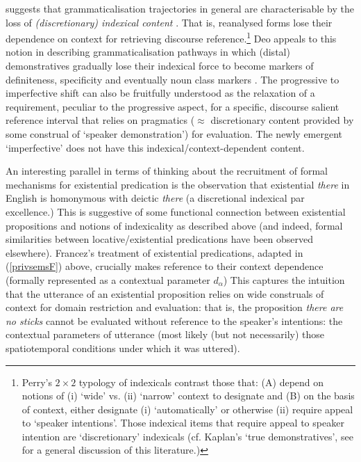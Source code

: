 \documentclass[usenames,dvipsnames,11pt]{article}
\begin{document}
{\citet{Deo2018} suggests that grammaticalisation trajectories in general are characterisable by the loss of \textit{(discretionary) indexical content} \citep[\textit{e.g.}][68\textit{ff}]{Perry2012}. That is, reanalysed forms lose their dependence on context for retrieving discourse reference.\footnote{Perry's \citeyearpar[68ff]{Perry2012} $2\times 2${} typology of indexicals contrast those that: (A) depend on notions of (i) `wide' vs. (ii) `narrow' context to designate and (B) on the basis of context, either designate (i) `automatically' or otherwise (ii) require appeal to `speaker intentions'. Those indexical items that require appeal to speaker intention are `discretionary' indexicals (cf. Kaplan's `true demonstratives', see \cite{Braun2017} for a general discussion of this literature.)} Deo appeals to this notion in describing grammaticalisation pathways in which (distal) demonstratives gradually lose their indexical force to become markers of definiteness, specificity and eventually noun class markers \citep[see also][61]{Greenberg1978,deMulder2011,Stevens2007}. The progressive to imperfective shift can also be fruitfully understood as the relaxation of a requirement, peculiar to the progressive aspect, for a specific, discourse salient reference interval that relies on pragmatics ($\approx$ discretionary content provided by some construal of `speaker demonstration') for evaluation. The newly emergent `imperfective' does not have this indexical/context-dependent content.

An interesting parallel in terms of thinking about the recruitment of formal mechanisms for existential predication is the observation that existential \textit{there} in English is homonymous with deictic \textit{there} (a discretional indexical par excellence.) This is suggestive of some functional connection between existential propositions and notions of indexicality as described above (and indeed, formal similarities between locative/existential predications have been observed elsewhere). Francez's \citeyear{Francez2007} treatment of existential predications, adapted in (\ref{privsemsF}) above, crucially makes reference to their context dependence (formally represented as a contextual parameter $d_\alpha$) This captures the intuition that the utterance of an existential proposition relies on wide construals of context for domain restriction and evaluation: that is, the proposition \textit{there are no sticks} cannot be evaluated without reference to the speaker's intentions: the contextual parameters of utterance (most likely (but not necessarily) those spatiotemporal conditions under which it was uttered). 

}
\end{document}
